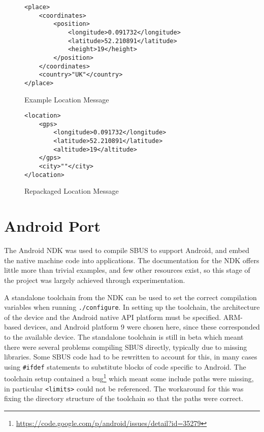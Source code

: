 \documentclass[12pt,twoside,notitlepage]{report}
\begin{document}
\begin{figure}
\begin{lstlisting}[style=xml]
<place>
	<coordinates>
		<position>
			<longitude>0.091732</longitude>
			<latitude>52.210891</latitude>
			<height>19</height>
		</position>
	</coordinates>
	<country>"UK"</country>
</place>
\end{lstlisting}
\caption{Example Location Message}
\label{fig:locationmessage}
\end{figure}

\begin{figure}
\begin{lstlisting}[style=xml]
<location>
	<gps>
		<longitude>0.091732</longitude>
		<latitude>52.210891</latitude>
		<altitude>19</altitude>
	</gps>
	<city>""</city>
</location>
\end{lstlisting}
\caption{Repackaged Location Message}
\label{fig:locationmessagerepack}
\end{figure}

\section{Android Port}

The Android NDK was used to compile SBUS to support Android, and embed the native machine code into applications. 
The documentation for the NDK offers little more than trivial examples, and few other resources exist, so this stage of the project was largely achieved through experimentation. 

A standalone toolchain from the NDK can be used to set the correct compilation variables when running {\tt ./configure}. 
In setting up the toolchain, the architecture of the device and the Android native API platform must be specified. 
ARM-based devices, and Android platform 9 were chosen here, since these corresponded to the available device. 
The standalone toolchain is still in beta which meant there were several problems compiling SBUS directly, typically due to missing libraries. 
Some SBUS code had to be rewritten to account for this, in many cases using {\tt \#ifdef} statements to substitute blocks of code specific to Android. 
The toolchain setup contained a bug\footnote{\url{https://code.google.com/p/android/issues/detail?id=35279}} which meant some include paths were missing, in particular {\tt <limits>} could not be referenced. 
The workaround for this was fixing the directory structure of the toolchain so that the paths were correct. 
\end{document}
